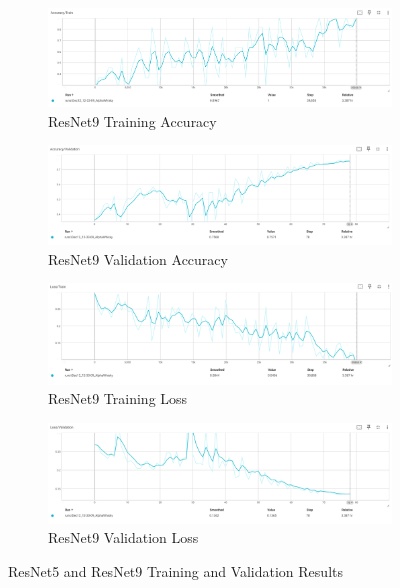 \documentclass{article}
\begin{document}
\begin{figure}[h]
    \begin{subfigure}{0.5\linewidth}
        \includegraphics[width=\linewidth]{images/resnet9_train_acc.jpg}
        \caption{ResNet9 Training Accuracy}
        \label{fig:train_acc}
    \end{subfigure}%
    \begin{subfigure}{0.5\linewidth}
        \includegraphics[width=\linewidth]{images/resnet9_val_acc.jpg}
        \caption{ResNet9 Validation Accuracy}
        \label{fig:val_acc}
    \end{subfigure}

    \begin{subfigure}{0.5\linewidth}
        \includegraphics[width=\linewidth]{images/resnet9_train_loss.jpg}
        \caption{ResNet9 Training Loss}
        \label{fig:train_loss}
    \end{subfigure}%
    \begin{subfigure}{0.5\linewidth}
        \includegraphics[width=\linewidth]{images/resnet9_val_loss.jpg}
        \caption{ResNet9 Validation Loss}
        \label{fig:val_loss}
    \end{subfigure}

    \caption{ResNet5 and ResNet9 Training and Validation Results}
    \label{fig:resnet_results}
\end{figure}
\end{document}

